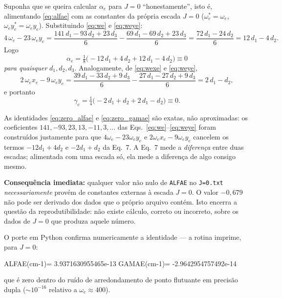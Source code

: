 \documentclass[11pt,a4paper]{article}
\newcommand{\we}{\omega_e}
\newcommand{\wexe}{\omega_e x_e}
\newcommand{\weye}{\omega_e y_e}
\newcommand{\alfae}{\alpha_e}
\newcommand{\gamae}{\gamma_e}
\begin{document}
\noindent
Suponha que se queira calcular $\alfae$ para $J=0$ ``honestamente'', isto é,
alimentando \eqref{eq:alfae} com as constantes da própria escada $J=0$
($\we^{\ast}=\we$, $\weye^{\ast}=\weye$). Substituindo \eqref{eq:we} e
\eqref{eq:weye}:
\begin{equation}
  4\,\we - 23\,\weye
  = \frac{141\,d_1 - 93\,d_2 + 23\,d_3}{6}
  - \frac{69\,d_1 - 69\,d_2 + 23\,d_3}{6}
  = \frac{72\,d_1 - 24\,d_2}{6}
  = 12\,d_1 - 4\,d_2 .
\end{equation}
Logo
\begin{equation}
  \boxed{\;
  \alfae = \tfrac{1}{8}\bigl(-12\,d_1 + 4\,d_2 + 12\,d_1 - 4\,d_2\bigr) \equiv 0
  \;}
  \label{eq:zero_alfae}
\end{equation}
\emph{para quaisquer} $d_1, d_2, d_3$. Analogamente, de \eqref{eq:wexe} e
\eqref{eq:weye},
\begin{equation}
  2\,\wexe - 9\,\weye
  = \frac{39\,d_1 - 33\,d_2 + 9\,d_3}{6} - \frac{27\,d_1 - 27\,d_2 + 9\,d_3}{6}
  = 2\,d_1 - d_2 ,
\end{equation}
e portanto
\begin{equation}
  \boxed{\;
  \gamae = \tfrac{1}{4}\bigl(-2\,d_1 + d_2 + 2\,d_1 - d_2\bigr) \equiv 0 .
  \;}
  \label{eq:zero_gamae}
\end{equation}

\noindent
As identidades \eqref{eq:zero_alfae} e \eqref{eq:zero_gamae} são exatas, não
aproximadas: os coeficientes $141, -93, 23, 13, -11, 3, \ldots$ das
Eqs.~\eqref{eq:we}--\eqref{eq:weye} foram construídos justamente para que
$4\we-23\weye$ e $2\wexe-9\weye$ cancelem os termos $-12d_1+4d_2$ e $-2d_1+d_2$
da Eq.~7. A Eq.~7 mede a \emph{diferença} entre duas escadas; alimentada com uma
escada só, ela mede a diferença de algo consigo mesmo.

\medskip
\noindent
\textbf{Consequência imediata:} qualquer valor não nulo de \texttt{ALFAE} no
\texttt{J=0.txt} \emph{necessariamente} provém de constantes externas à escada
$J=0$. O valor $-0{,}679$ não pode ser derivado dos dados que o próprio arquivo
contém. Isto encerra a questão da reprodutibilidade: não existe cálculo, correto
ou incorreto, sobre os dados de $J=0$ que produza aquele número.

\medskip
\noindent
O porte em Python confirma numericamente a identidade --- a rotina imprime, para
$J=0$:
\begin{center}
\ttfamily
ALFAE(cm-1)= 3.9371630955465e-13 \qquad GAMAE(cm-1)= -2.9642954757492e-14
\end{center}
que é zero dentro do ruído de arredondamento de ponto flutuante em precisão
dupla ($\sim\!10^{-16}$ relativo a $\we\approx400$).
\end{document}
